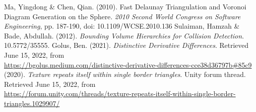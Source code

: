 \begin{thebibliography}{9}
Ma,  Yingdong \& Chen, Qian. (2010). Fast Delaunay Triangulation and Voronoi Diagram Generation on the Sphere. \textit{2010 Second World Congress on Software Engineering},  pp. 187-190, doi: 10.1109/WCSE.2010.136
Sulaiman, Hamzah \& Bade, Abdullah. (2012). \textit{Bounding Volume Hierarchies for Collision Detection}. 10.5772/35555.
Golus, Ben. (2021). \textit{Distinctive Derivative Differences}. Retrieved June 15, 2022, from\\ \url{https://bgolus.medium.com/distinctive-derivative-differences-cce38d36797b\#85c9}
(2020). \textit{Texture repeats itself within single border triangles}. Unity forum thread. Retrieved June 15, 2022, from\\ \url{https://forum.unity.com/threads/texture-repeats-itself-within-single-border-triangles.1029907/}
\end{thebibliography}
